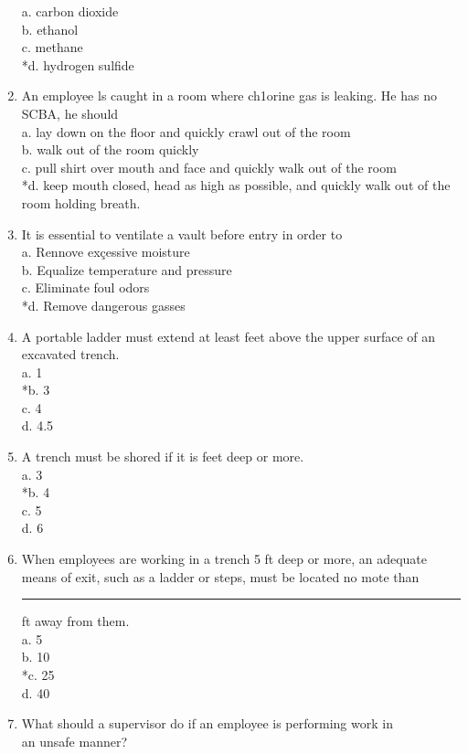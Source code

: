 \begin{enumerate}[1.]
a. carbon dioxide\\
b. ethanol\\
c. methane\\
*d. hydrogen sulfide\\
\item An employee ls caught in a room where ch1orine gas is leaking. He has no SCBA, he should\\
a. lay down on the floor and quickly crawl out of the room\\
b. walk out of the room quickly\\
c. pull shirt over mouth and face and quickly walk out of the room\\
*d. keep mouth closed, head as high as possible, and quickly walk out of the room holding breath.\\
\item It is essential to ventilate a vault before entry in order to\\
a. Rennove exçessive moisture\\
b. Equalize temperature and pressure\\
c. Eliminate foul odors\\
*d. Remove dangerous gasses\\
\item A portable ladder must extend at least feet above the upper surface of an excavated trench.\\
a. 1\\
*b. 3\\
c. 4\\
d. 4.5\\
\item A trench must be shored if it is feet deep or more.\\
a. 3\\
*b. 4\\
c. 5\\
d. 6\\
\item When employees are working in a trench 5 ft deep or more, an adequate means of exit, such as a ladder or steps, must be located no mote than \rule{2cm}{2pt} ft away from them.\\
a. 5\\
b. 10\\
*c. 25\\
d. 40\\
\item What should a supervisor do if an employee is performing work in\\
an unsafe manner?\\

\end{enumerate}
